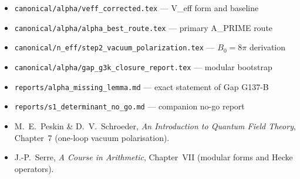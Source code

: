 \documentclass[12pt,a4paper]{article}
\theoremstyle{definition}
\theoremstyle{remark}
\begin{document}
\begin{itemize}
  \item \texttt{canonical/alpha/veff\_corrected.tex} — V\_eff form and baseline
  \item \texttt{canonical/alpha/alpha\_best\_route.tex} — primary A\_PRIME route
  \item \texttt{canonical/n\_eff/step2\_vacuum\_polarization.tex} — $B_0 = 8\pi$ derivation
  \item \texttt{canonical/alpha/gap\_g3k\_closure\_report.tex} — modular bootstrap
  \item \texttt{reports/alpha\_missing\_lemma.md} — exact statement of Gap G137-B
  \item \texttt{reports/s1\_determinant\_no\_go.md} — companion no-go report
  \item M.\ E.\ Peskin \& D.\ V.\ Schroeder, \textit{An Introduction to Quantum
        Field Theory}, Chapter~7 (one-loop vacuum polarisation).
  \item J.-P.\ Serre, \textit{A Course in Arithmetic}, Chapter~VII (modular forms
        and Hecke operators).
\end{itemize}

\ifdefined\INCLUDEMODE
\else
  
\end{document}
